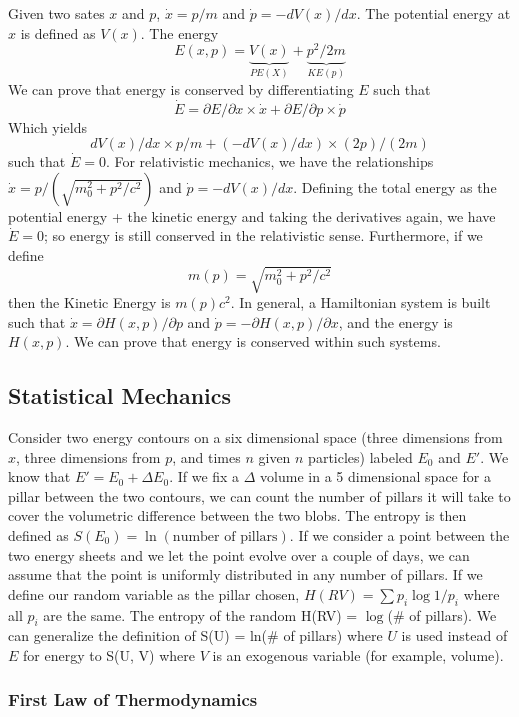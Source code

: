 \documentclass[11pt]{article}
\theoremstyle{definition}
\begin{document}
Given two sates $x$ and $p$, $\dot{x} = p/m$ and $\dot{p} = - dV(x)/dx$. The potential energy at $x$ is defined as $V(x)$. The energy $$E(x, p) = \underbrace{V(x)}_{PE(X)} + \underbrace{p^2/2m}_{{KE(p)}}$$ We can prove that energy is conserved by differentiating $E$ such that $$\dot{E} = \partial E / \partial x \times \dot{x} + \partial E / \partial p \times \dot{p}$$Which yields $$dV(x)/dx \times p/m + (-dV(x)/dx) \times (2p)/(2m)$$ such that $\dot{E}= 0$. For relativistic mechanics, we have the relationships $\dot{x} = p/(\sqrt{m_0^2 + p^2/c^2})$ and $\dot{p} = -dV(x)/dx$. Defining the total energy as the potential energy + the kinetic energy and taking the derivatives again, we have $\dot{E} = 0$; so energy is still conserved in the relativistic sense. Furthermore, if we define $$m(p) = \sqrt{m_0^2 + p^2/c^2}$$ then the Kinetic Energy is $m(p)c^2$. In general, a Hamiltonian system is built such that $\dot{x} = \partial H(x, p) / \partial p$ and $\dot{p} = - \partial H(x, p)/\partial x$, and the energy is $H(x, p)$. We can prove that energy is conserved within such systems. 

\subsection{Statistical Mechanics} 

Consider two energy contours on a six dimensional space (three dimensions from $x$, three dimensions from $p$, and times $n$ given $n$ particles) labeled $E_0$ and $E'$. We know that $E' = E_0 + \Delta E_0$. If we fix a $\Delta$ volume in a 5 dimensional space for a pillar between the two contours, we can count the number of pillars it will take to cover the volumetric difference between the two blobs. The entropy is then defined as $S(E_0) = \ln(\text{number of pillars})$. If we consider a point between the two energy sheets and we let the point evolve over a couple of days, we can assume that the point is uniformly distributed in any number of pillars. If we define our random variable as the pillar chosen, $H(RV) = \sum p_i \log 1/p_i$ where all $p_i$ are the same. The entropy of the random H(RV) = $\log$(\# of pillars). We can generalize the definition of S(U) = ln(\# of pillars) where $U$ is used instead of $E$ for energy to S(U, V) where $V$ is an exogenous variable (for example, volume). 

\subsubsection{First Law of Thermodynamics}
\end{document}
